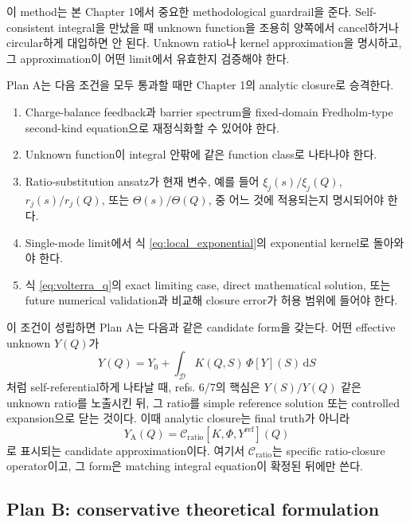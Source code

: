 \documentclass[11pt]{article}
\newcommand{\dd}{\mathrm{d}}
\begin{document}
이 method는 본 Chapter 1에서 중요한 methodological guardrail을 준다. Self-consistent integral을
만났을 때 unknown function을 조용히 양쪽에서 cancel하거나 circular하게 대입하면 안 된다. Unknown
ratio나 kernel approximation을 명시하고, 그 approximation이 어떤 limit에서 유효한지 검증해야 한다.

Plan A는 다음 조건을 모두 통과할 때만 Chapter 1의 analytic closure로 승격한다.

\begin{enumerate}[label=\textbf{M\arabic*.}]
\item Charge-balance feedback과 barrier spectrum을 fixed-domain Fredholm-type second-kind
equation으로 재정식화할 수 있어야 한다.
\item Unknown function이 integral 안팎에 같은 function class로 나타나야 한다.
\item Ratio-substitution ansatz가 현재 변수, 예를 들어 \(\xi_j(s)/\xi_j(Q)\),
\(r_j(s)/r_j(Q)\), 또는 \(\Theta(s)/\Theta(Q)\), 중 어느 것에 적용되는지 명시되어야 한다.
\item Single-mode limit에서 식 \eqref{eq:local_exponential}의 exponential kernel로 돌아와야 한다.
\item 식 \eqref{eq:volterra_q}의 exact limiting case, direct mathematical solution, 또는 future
numerical validation과 비교해 closure error가 허용 범위에 들어야 한다.
\end{enumerate}

이 조건이 성립하면 Plan A는 다음과 같은 candidate form을 갖는다. 어떤 effective unknown
\(Y(Q)\)가
\begin{equation}
Y(Q)=Y_0+\int_{\mathcal D}K(Q,S)\,\Phi[Y](S)\,\dd S
\label{eq:closure_general}
\end{equation}
처럼 self-referential하게 나타날 때, refs. 6/7의 핵심은 \(Y(S)/Y(Q)\) 같은 unknown ratio를
노출시킨 뒤, 그 ratio를 simple reference solution 또는 controlled expansion으로 닫는 것이다. 이때
analytic closure는 final truth가 아니라
\begin{equation}
Y_{\mathrm A}(Q)
=
\mathcal C_{\mathrm{ratio}}\!\left[
K,\Phi,Y^{\mathrm{ref}}
\right](Q)
\label{eq:plan_a_closure}
\end{equation}
로 표시되는 candidate approximation이다. 여기서 \(\mathcal C_{\mathrm{ratio}}\)는 specific
ratio-closure operator이고, 그 form은 matching integral equation이 확정된 뒤에만 쓴다.

\subsection{Plan B: conservative theoretical formulation}\label{subsec:planb}
\end{document}
